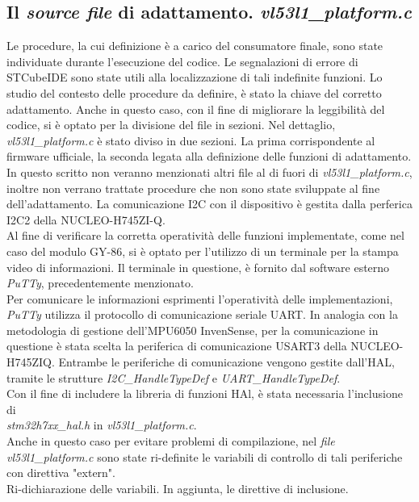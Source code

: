 \documentclass[11pt]{report}
\begin{document}
\subsection{Il \textit{source file} di adattamento. \textit{vl53l1\_platform.c}}
Le procedure, la cui definizione è a carico del consumatore finale, sono state individuate durante l'esecuzione del codice. Le segnalazioni di errore di STCubeIDE sono state utili alla localizzazione di tali indefinite funzioni.
Lo studio del contesto delle procedure da definire, è stato la chiave del corretto adattamento.
Anche in questo caso, con il fine di migliorare la leggibilità del codice, si è optato per la divisione del file in sezioni. Nel dettaglio, \textit{vl53l1\_platform.c} è stato diviso in due sezioni.
La prima corrispondente al firmware ufficiale, la seconda legata alla definizione delle funzioni di adattamento.\\
In questo scritto non veranno menzionati altri file al di fuori di \textit{vl53l1\_platform.c}, inoltre non verrano trattate procedure che non sono state sviluppate al fine dell'adattamento.
La comunicazione I2C con il dispositivo è gestita dalla perferica I2C2 della NUCLEO-H745ZI-Q.\\
Al fine di verificare la corretta operatività delle funzioni implementate, come nel caso del modulo GY-86, si è optato per l'utilizzo di un terminale per la stampa video di informazioni. Il terminale in questione, è fornito dal software esterno \textit{PuTTy}, precedentemente menzionato.\\
Per comunicare le informazioni esprimenti l'operatività delle implementazioni, \textit{PuTTy} utilizza il protocollo di comunicazione seriale UART. In analogia con la metodologia di gestione dell'MPU6050 InvenSense, per la comunicazione in questione è stata scelta la periferica di comunicazione USART3 della NUCLEO-H745ZIQ.
Entrambe le periferiche di comunicazione vengono gestite dall'HAL, tramite le strutture \textit{I2C\_HandleTypeDef} e \textit{UART\_HandleTypeDef}.\\
Con il fine di includere la libreria di funzioni HAl, è stata necessaria l'inclusione di\\\textit{stm32h7xx\_hal.h} in \textit{vl53l1\_platform.c}.\\
Anche in questo caso per evitare problemi di compilazione, nel \textit{file vl53l1\_platform.c} sono state ri-definite le variabili di controllo di tali periferiche con direttiva "extern".\\
Ri-dichiarazione delle variabili. In aggiunta, le direttive di inclusione.
\end{document}
